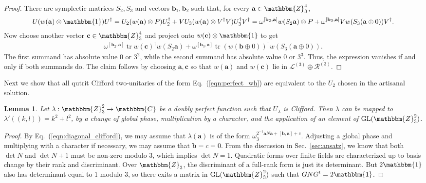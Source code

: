 \documentclass[aps,nofootinbib,floatfix,a4paper]{revtex4}
\newtheorem{lemma}[theorem]{Lemma}
\newcommand{\1}{\mbox{$\mathbf{1}$}}
\def\ZZ{\mathbbm{Z}}
\def\CC{\mathbbm{C}}
\def\R{\mathcal{R}}
\def\Id{\mathbbm{1}}
\DeclareMathOperator{\GL}{GL}
\DeclareMathOperator{\tr}{tr}
\renewcommand{\vec}{\mathbf}
\begin{document}
%

%

\begin{proof}
	There are symplectic matrices $S_2, S_3$ and 
	vectors $\vec b_1, \vec b_2$ such that,
	for every
	$\vec a\in\ZZ_3^4$,  
	\begin{align*}
		U (w(\vec a) \otimes \Id) U^\dagger
		=
		U_2 (w(\vec a) \otimes P)  U_2^\dagger
		+
		V U_3  (w(\vec a) \otimes V^\dagger V) U^\dagger_3 V^\dagger
		=
		\omega^{[\vec b_2, \vec a]}
		w(S_2 \vec a)\otimes P
		+
		\omega^{[\vec b_3, \vec a]}
		V w(S_3 (\vec a\oplus 0)) V^\dagger.
	\end{align*} 
	Now choose another vector $\vec c\in\ZZ_3^4$ and
	project onto $w(\vec c)\otimes \Id$ to get
	\begin{align*}
		\omega^{[\vec b_2, \vec a]}
		\tr w(\vec c)^\dagger w(S_2 \vec a)
		+
		\omega^{[\vec b_3, \vec a]}
		\tr
		(w(\vec b\oplus 0))^\dagger
		w(S_3 (\vec a\oplus 0)).
	\end{align*}
	The first summand has absolute value $0$ or $3^2$, while the second summand has absolute value $0$ or $3^3$.
	Thus, the expression vanishes if and only if both summands do.
	The claim follows by choosing $\vec a, \vec c$ so that $w(\vec a)$ and $w(\vec c)$ lie in 
	$\mathcal{L}^{(3)}\oplus \R^{(3)}$.
\end{proof}

Next we show that all qutrit Clifford two-unitaries of the form Eq.~(\ref{eqn:perfect_wh}) are equivalent to the $U_2$ chosen in the artisanal solution.

\begin{lemma}\label{lem:only_one_perfection}
	Let $\lambda:\ZZ_3^2\to\CC$ be a doubly perfect function such that $U_\lambda$ is Clifford.
	Then 
	$\lambda$ 
	can be mapped to 
	$\lambda'((k,l))=k^2+l^2$, by a change of global phase,
	multiplication by a character, 
	and the application of an element of $\GL(\ZZ_3^2)$.
\end{lemma}

\begin{proof}
	By Eq.~(\ref{eqn:diagonal_clifford}), we may assume that $\lambda(\vec a)$ is of the form $\omega_3^{2^{-1}\vec a N \vec a + [\vec b, \vec a] + c}$.
	Adjusting a global phase and multiplying with a character if necessary, we may assume that $\vec b=c = 0$.
	From the discussion in Sec.~\ref{sec:ansatz}, we know that both $\det N$ and $\det N + 1$ must be non-zero modulo 3, which implies $\det N=1$.
	Quadratic forms over finite fields are characterized up to basis change by their rank and discriminant.
	Over $\ZZ_3$, the discriminant of a full-rank form is just its determinant.
	But $2\Id$ also has determinant equal to $1$ modulo $3$, so there exits a matrix in 
	$\GL(\ZZ_3^2)$
	such that $G N G^t=2\Id$.
\end{proof}
\end{document}
